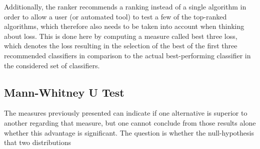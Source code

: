 Additionally, the ranker recommends a ranking instead of a single algorithm in order to allow a user (or automated tool) to test a few of the top-ranked algorithms, which therefore also needs to be taken into account when thinking about loss. This is done here by computing a measure called best three loss, which denotes the loss resulting in the selection of the best of the first three recommended classifiers in comparison to the actual best-performing classifier in the considered set of classifiers. 


\subsection{Mann-Whitney U Test}
The measures previously presented can indicate if one alternative is superior to another regarding that measure, but one cannot conclude from those results alone whether this advantage is significant. The question is whether the null-hypothesis that two distributions \cite{mann1947test}
